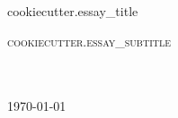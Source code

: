 \begin{titlepage}

  \begin{center}


    {
      \fontsize{60pt}{70pt}\selectfont
      \textcolor{titlecolor}
      {{{cookiecutter.essay_title}}}\\[2cm]
    }

    \textsc{\huge
      {{cookiecutter.essay_subtitle}}
    }\\[0.5cm]

    \emph{}\\[0.1cm]
    \noindent{}\\[1cm]

    \vfill

    {\large \today}

  \end{center}
\end{titlepage}
